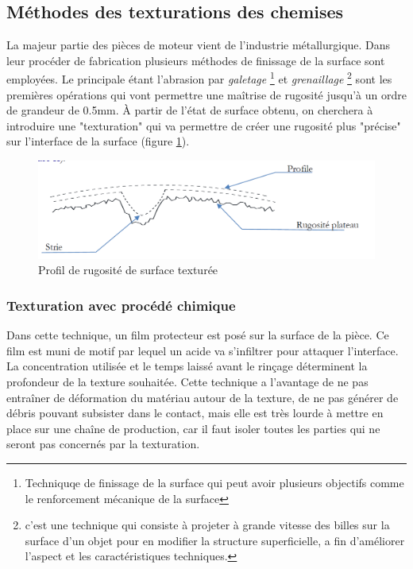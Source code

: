 \subsection{Méthodes des texturations des chemises}
La majeur partie des pièces de moteur vient de l'industrie métallurgique. Dans leur procéder de fabrication plusieurs méthodes de finissage de la surface sont employées. Le principale étant l'abrasion par \emph{galetage} \footnote{Techniquqe de finissage  de la surface qui peut avoir plusieurs objectifs comme le renforcement mécanique de la surface} et \emph{ grenaillage} \footnote{c'est une technique qui consiste à projeter à grande vitesse des billes sur la surface d'un objet pour en modifier la structure superficielle, a fin d'améliorer l'aspect et les caractéristiques techniques.} sont les premières opérations qui vont permettre une maîtrise de rugosité jusqu’à un ordre de grandeur de 0.5mm.\cite{ayad1} À partir de l’état de surface obtenu, on cherchera à introduire une "texturation" qui va permettre de créer une rugosité plus "précise" sur l’interface de la surface (figure \ref{fig:caracterisation}).
\begin{figure}[h]
	\centering
	\includegraphics[width=0.7\linewidth]{Img/caracterisation}
	\caption[surface texturée]{Profil de rugosité de surface texturée}
	\label{fig:caracterisation}
\end{figure}
\subsubsection{Texturation avec procédé chimique}
Dans cette technique, un film protecteur est posé sur la surface de la pièce. Ce film est muni de motif par lequel un acide va s’infiltrer pour attaquer l’interface. La concentration utilisée et le temps laissé avant le rinçage déterminent la profondeur de la texture souhaitée. Cette technique a l’avantage de ne pas entraîner de déformation du matériau autour de la texture, de ne pas générer de débris pouvant subsister dans le contact, mais elle est très lourde à mettre en place sur une chaîne de production, car il faut isoler toutes les parties qui ne seront pas concernés par la texturation.
